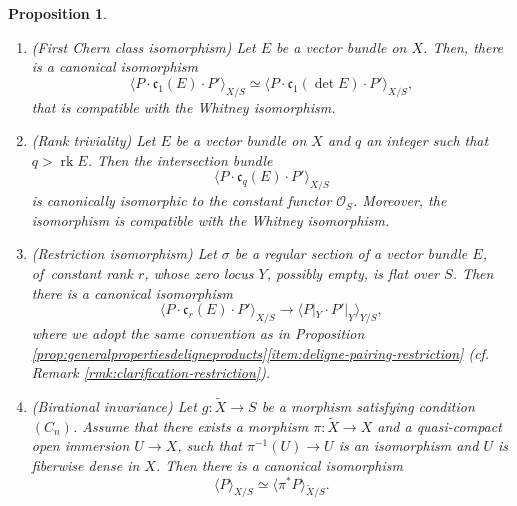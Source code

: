 \documentclass[11pt]{article}
\newcommand{\cf}{cf.\xspace}
\theoremstyle{plain}
\newtheorem{proposition}[theorem]{Proposition}
\theoremstyle{definition}
\newcommand{\Ocal}{\mathcal O}
\newcommand{\cfrak}{\mathfrak c}
\DeclareMathOperator{\rk}{rk}
\begin{document}
\begin{proposition}
\begin{enumerate}
\item\label{item:first-chern-determinant} (First Chern class isomorphism) Let $E$ be a vector bundle on $X$. Then, there is a canonical isomorphism
\begin{displaymath}
\langle P\cdot \cfrak_{1}(E)\cdot P'\rangle_{X/S} \simeq \langle P\cdot \cfrak_{1}(\det E)\cdot P'\rangle_{X/S},
\end{displaymath}
that is compatible with the Whitney isomorphism.
\item \label{item:Chern-rank}(Rank triviality) Let $E$ be a vector bundle on $X$ and $q$ an integer such that $q > \rk E$. Then the intersection bundle
\begin{displaymath}
\langle P \cdot \cfrak_q(E) \cdot P' \rangle_{X/S}
\end{displaymath}
is canonically isomorphic to the constant functor $\Ocal_S$. Moreover, the isomorphism is compatible with the Whitney isomorphism.
\item\label{item:restriction-isomorphism} (Restriction isomorphism) Let $\sigma$ be a regular section of a vector bundle $E$, of~constant rank $r$, whose zero locus $Y$, possibly empty, is flat over $S$. Then there is a canonical isomorphism
\begin{displaymath}
\langle P \cdot \cfrak_{r}(E) \cdot P' \rangle_{X/S} \to \langle P|_Y \cdot P'|_Y \rangle_{Y/S},
\end{displaymath}
where we adopt the same convention as in Proposition \ref{prop:generalpropertiesdeligneproducts}\eqref{item:deligne-pairing-restriction} (\cf Remark \ref{rmk:clarification-restriction}).
\item \label{item:birational-invariance} (Birational invariance) Let $g: \widetilde{X} \to S$ be a morphism satisfying condition $(C_n)$. Assume that there exists a morphism $\pi\colon \widetilde{X} \to X$ and a quasi-compact open immersion $U \to X$, such that $\pi^{-1}(U) \to U$ is an isomorphism and $U$ is fiberwise dense in $X$.
Then there is a canonical isomorphism
\begin{displaymath}
\langle P \rangle_{X/S}\simeq \langle \pi^\ast P \rangle_{\widetilde{X}/S}.
\end{displaymath}
\end{enumerate}
\end{proposition}
\end{document}
